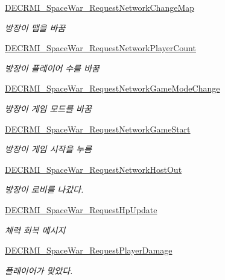 \begin{DoxyCompactItemize}
\hyperlink{class_server_affeebba3a07d0879b8e277d4bc69de8c}{D\+E\+C\+R\+M\+I\+\_\+\+Space\+War\+\_\+\+Request\+Network\+Change\+Map}
\begin{DoxyCompactList}\small\item\em 방장이 맵을 바꿈 \end{DoxyCompactList}\item 
\hyperlink{class_server_aec90b69791b068bf3eef6cb62ff24b68}{D\+E\+C\+R\+M\+I\+\_\+\+Space\+War\+\_\+\+Request\+Network\+Player\+Count}
\begin{DoxyCompactList}\small\item\em 방장이 플레이어 수를 바꿈 \end{DoxyCompactList}\item 
\hyperlink{class_server_aed5edbf6ff4184fa0cfcc73c5a7d18b9}{D\+E\+C\+R\+M\+I\+\_\+\+Space\+War\+\_\+\+Request\+Network\+Game\+Mode\+Change}
\begin{DoxyCompactList}\small\item\em 방장이 게임 모드를 바꿈 \end{DoxyCompactList}\item 
\hyperlink{class_server_a19bb025a2834bd960f2ecb60683febfd}{D\+E\+C\+R\+M\+I\+\_\+\+Space\+War\+\_\+\+Request\+Network\+Game\+Start}
\begin{DoxyCompactList}\small\item\em 방장이 게임 시작을 누름 \end{DoxyCompactList}\item 
\hyperlink{class_server_a5026f52152e0de66fe5559bdb20a67bc}{D\+E\+C\+R\+M\+I\+\_\+\+Space\+War\+\_\+\+Request\+Network\+Host\+Out}
\begin{DoxyCompactList}\small\item\em 방장이 로비를 나갔다. \end{DoxyCompactList}\item 
\hyperlink{class_server_a49668e2393bb446bf02ebadbd75ef1b5}{D\+E\+C\+R\+M\+I\+\_\+\+Space\+War\+\_\+\+Request\+Hp\+Update}
\begin{DoxyCompactList}\small\item\em 체력 회복 메시지 \end{DoxyCompactList}\item 
\hyperlink{class_server_a6741c7a348e641daa0375aa2f483a1ab}{D\+E\+C\+R\+M\+I\+\_\+\+Space\+War\+\_\+\+Request\+Player\+Damage}
\begin{DoxyCompactList}\small\item\em 플레이어가 맞았다. \end{DoxyCompactList}\item 

\end{DoxyCompactItemize}
